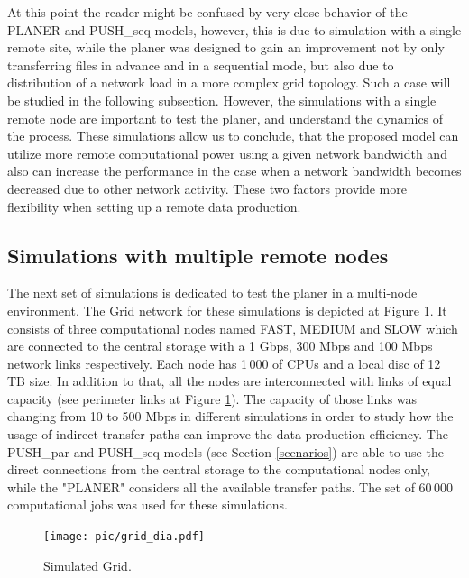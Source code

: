 \documentclass{svjour3}                     %
\begin{document}

At this point the reader might be confused by very close behavior of the PLANER and PUSH\_seq models, however, this is due to simulation with a single remote site, while the planer was designed to gain an improvement not by only  transferring files in advance and in a sequential mode, but also due to distribution of a network load in a more complex grid topology. Such a case will be studied in the following subsection. However, the simulations with a single remote node are important to test the planer, and understand the dynamics of the process. These simulations allow us to conclude, that the proposed model can utilize more remote computational power using a given network bandwidth and also can increase the performance in the case when a network bandwidth becomes decreased due to other network activity. These two factors provide more flexibility when setting up a remote data production.


\subsection{Simulations with multiple remote nodes}

The next set of simulations is dedicated to test the planer in a multi-node environment. The Grid network for these simulations is depicted at Figure \ref{simulated_grid}. It consists of three computational nodes named FAST, MEDIUM and SLOW which are connected to the central storage with a 1 Gbps, 300 Mbps and 100 Mbps network links respectively. Each node has 1\,000 of CPUs and a local disc of 12 TB size. In addition to that, all the nodes are interconnected with links of equal capacity (see perimeter links at Figure \ref{simulated_grid}). The capacity of those links was changing from 10 to 500 Mbps in different simulations in order to study how the usage of indirect transfer paths can improve the data production efficiency. The PUSH\_par and PUSH\_seq models (see Section \ref{scenarios}) are able to use the direct connections from the central storage to the computational nodes only, while the "PLANER" considers all the available transfer paths. The set of 60\,000 computational jobs was used for these simulations.
\begin{figure}
  \begin{center}
    \texttt{[image: pic/grid\_dia.pdf]}
    \caption{Simulated Grid.}
    \label{simulated_grid}	
  \end{center}  
\end{figure}
\end{document}
